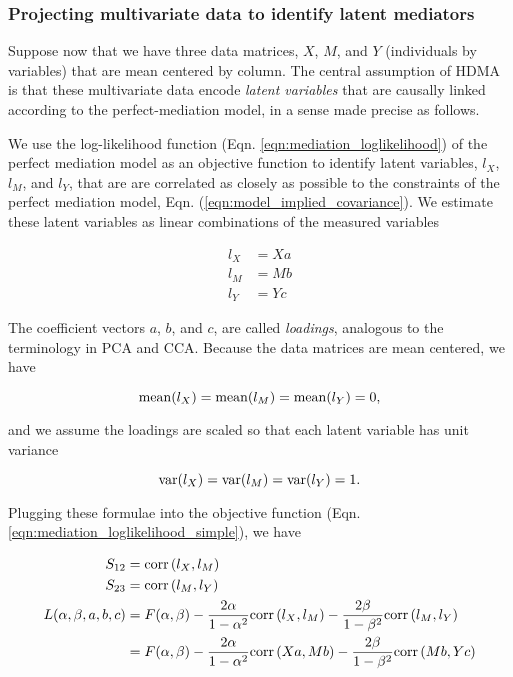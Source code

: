 \documentclass[
]{article}
\begin{document}
\subsubsection{Projecting multivariate data to identify latent
mediators}\label{projecting-multivariate-data-to-identify-latent-mediators}

Suppose now that we have three data matrices, \(X\), \(M\), and \(Y\)
(individuals by variables) that are mean centered by column. The central
assumption of HDMA is that these multivariate data encode
\textit{latent variables} that are causally linked according to the
perfect-mediation model, in a sense made precise as follows.

We use the log-likelihood function (Eqn.
\ref{eqn:mediation_loglikelihood}) of the perfect mediation model as an
objective function to identify latent variables, \(l_X\), \(l_M\), and
\(l_Y\), that are are correlated as closely as possible to the
constraints of the perfect mediation model, Eqn.
(\ref{eqn:model_implied_covariance}). We estimate these latent variables
as linear combinations of the measured variables

\begin{align}
l_X &= Xa \\
l_M &= Mb \\
l_Y &= Yc
\end{align}

The coefficient vectors \(a\), \(b\), and \(c\), are called
\textit{loadings}, analogous to the terminology in PCA and CCA. Because
the data matrices are mean centered, we have

\begin{equation}
{\rm mean}(l_X) = {\rm mean}(l_M) = {\rm mean}(l_Y) = 0,
\end{equation}

and we assume the loadings are scaled so that each latent variable has
unit variance

\begin{equation}
{\rm var}(l_X) = {\rm var}(l_M) = {\rm var}(l_Y) = 1.
\end{equation}

Plugging these formulae into the objective function (Eqn.
\ref{eqn:mediation_loglikelihood_simple}), we have

\begin{align}
S_{12} &= {\rm corr}\left(l_X, l_M\right)\\
S_{23} &= {\rm corr}\left(l_M, l_Y\right)\\
\label{eqn:gcca_mediation}
L(\alpha, \beta, a,b,c) &= F(\alpha, \beta) - \frac{2\alpha}{1-\alpha^2} {\rm corr}\left(l_X, l_M\right) - \frac{2\beta}{1-\beta^2} {\rm corr}\left(l_M, l_Y\right) \\ 
&= F(\alpha, \beta) - \frac{2\alpha}{1-\alpha^2} {\rm corr}\left(Xa, Mb\right) - \frac{2\beta}{1-\beta^2} {\rm corr}\left(Mb, Yc\right)
\end{align}
\end{document}
